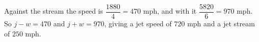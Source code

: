 Against the stream the speed is $\dfrac{1880}{4}=470$ mph, and with it $\dfrac{5820}{6}=970$ mph. So $j-w=470$ and $j+w=970$, giving a jet speed of $\boxed{720\text{ mph}}$ and a jet stream of $\boxed{250\text{ mph}}$.
